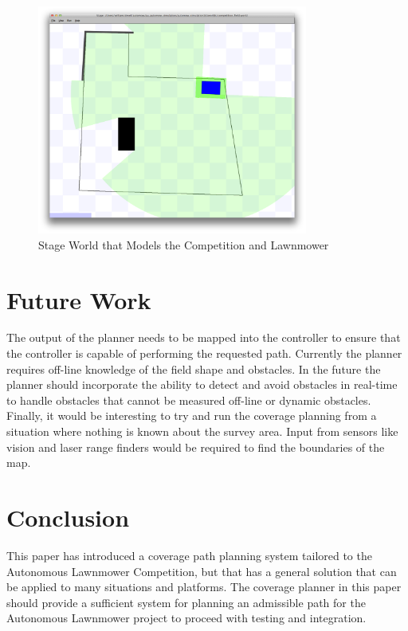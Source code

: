 \documentclass[journal]{IEEEtran}
\begin{document}
  \begin{figure}[here]
    \centering
    \includegraphics[width=3.5in,keepaspectratio]{stage.pdf}
    \caption{Stage World that Models the Competition and Lawnmower}
    \label{fig:stage}
  \end{figure}
  
  \section{Future Work}
  The output of the planner needs to be mapped into the controller to ensure that the controller is capable of performing the requested path.  Currently the planner requires off-line knowledge of the field shape and obstacles.  In the future the planner should incorporate the ability to detect and avoid obstacles in real-time to handle obstacles that cannot be measured off-line or dynamic obstacles.  Finally, it would be interesting to try and run the coverage planning from a situation where nothing is known about the survey area.  Input from sensors like vision and laser range finders would be required to find the boundaries of the map.
  
  \section{Conclusion}
  This paper has introduced a coverage path planning system tailored to the Autonomous Lawnmower Competition, but that has a general solution that can be applied to many situations and platforms.  The coverage planner in this paper should provide a sufficient system for planning an admissible path for the Autonomous Lawnmower project to proceed with testing and integration.
  
  \newpage
  
  
  
  
\end{document}
